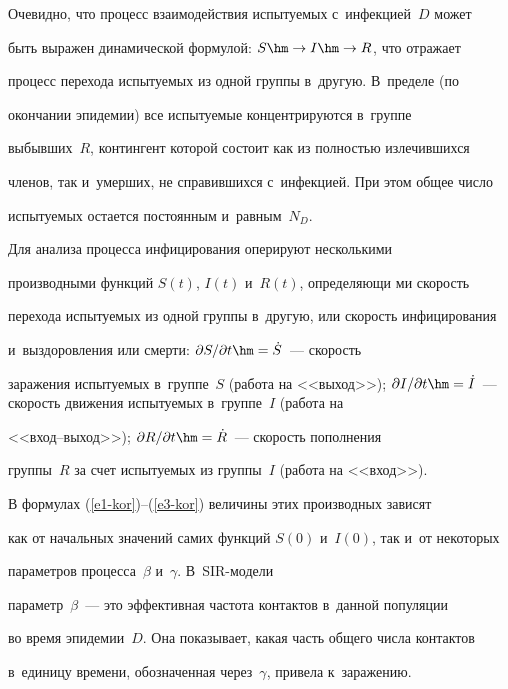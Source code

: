   Очевидно, что процесс взаимодействия испытуемых с~инфекцией~$D$ может 


быть выражен динамической формулой: $S\hm\to I\hm\to R$, что отражает 


процесс перехода ис\-пы\-ту\-емых из одной группы в~другую. В~пределе (по 


окончании эпидемии) все ис\-пы\-ту\-емые концентрируются в~группе 


вы\-быв\-ших~$R$, контингент которой со\-сто\-ит как из полностью излечившихся 


членов, так и~умерших, не справившихся с~инфекцией. При этом общее чис\-ло 


испытуемых остается постоянным и~рав\-ным~$N_D$. 


  


  Для анализа процесса инфицирования оперируют несколькими 


производными функций $S(t)$, $I(t)$ и~$R(t)$, опре\-де\-ля\-ющи\- ми ско\-рость 


перехода ис\-пы\-ту\-емых из одной группы в~другую, или ско\-рость инфицирования 


и~вы\-здо\-ров\-ле\-ния или смер\-ти: $\partial S/\partial t\hm= \dot{S}$~--- ско\-рость 


заражения испытуемых в~группе~$S$ (работа на <<выход>>); $\partial I/\partial t 


\hm= \dot{I}$~--- ско\-рость движения испытуемых в~группе~$I$ (работа на 


<<вход--вы\-ход>>); $\partial R/\partial t\hm= \dot{R}$~--- ско\-рость пополнения 


группы~$R$ за счет ис\-пы\-ту\-емых из группы~$I$ (работа на <<вход>>). 


  


  В формулах (\ref{e1-kor})--(\ref{e3-kor}) величины этих производных зависят 


как от начальных значений самих функций $S(0)$ и~$I(0)$, так и~от некоторых 


па\-ра\-мет\-ров процесса~$\beta$ и~$\gamma$. В~SIR-мо\-де\-ли 


параметр~$\beta$~--- это эффективная час\-то\-та контактов в~данной популяции 


во время эпидемии~$D$. Она показывает, какая часть общего чис\-ла контактов 


в~единицу времени, обозначенная через~$\gamma$, привела к~заражению.





